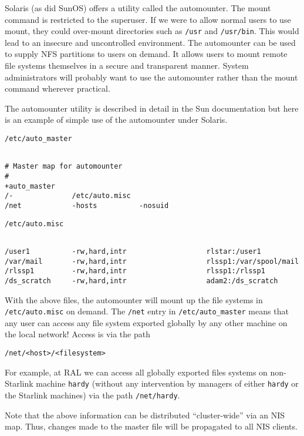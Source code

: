 Solaris (as did SunOS) offers a utility called the automounter. The mount command is restricted
to the superuser. If we were to allow normal users to use mount, they could
over-mount directories such as {\tt /usr} and {\tt /usr/bin}. This would lead to an
insecure and uncontrolled environment. The automounter can be used to supply
NFS partitions to users on demand. It allows users to mount remote file
systems themselves in a secure and transparent manner. System administrators
will probably want to use the automounter rather than the mount command
wherever practical.

The automounter utility is described in detail in the Sun documentation but
here is an example of simple use of the automounter under Solaris. 

\verb+/etc/auto_master+

\begin{verbatim}

# Master map for automounter
#
+auto_master
/-              /etc/auto.misc
/net            -hosts          -nosuid

\end{verbatim}

\verb+/etc/auto.misc+

\begin{verbatim}

/user1          -rw,hard,intr                   rlstar:/user1
/var/mail       -rw,hard,intr                   rlssp1:/var/spool/mail
/rlssp1         -rw,hard,intr                   rlssp1:/rlssp1
/ds_scratch     -rw,hard,intr                   adam2:/ds_scratch

\end{verbatim}

With the above files, the automounter will mount up the file systems
in \verb+/etc/auto.misc+ on demand. The {\tt /net} entry in \verb+/etc/auto_master+
means that any user can access any file system exported globally by any 
other machine on the local network! Access is via the path

\verb+/net/<host>/<filesystem>+

For example, at RAL we can access all globally exported files systems 
on non-Starlink machine \verb+hardy+ (without any intervention by
managers of either \verb+hardy+ or the Starlink machines) via 
the path \verb+/net/hardy+.

Note that the above information can be distributed ``cluster-wide'' via an
NIS map. Thus, changes made to the master file will be propagated to all
NIS clients. 

